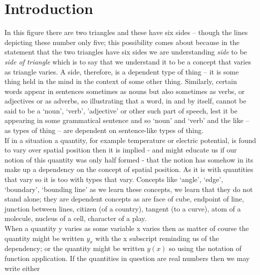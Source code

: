\documentclass[10pt,a4paper]{scrartcl}
\begin{document}
\section{Introduction}
\noindent In this figure
\raisebox{-0.5cm}{
\pspicture(0,-0.1)(1.1,1)
\psline(0,0)(0,1)(1,1)(1,0)(0,0)
\psline (0,0)(1,1)
\endpspicture
}
there are two triangles and these have six sides -- though the lines depicting these number only five; 
this possibility comes about
because in the statement that the two triangles have six sides we are understanding \textit{side}
to be \textit{side of triangle} which is to say that we understand it to be a concept that varies as
triangle varies. A side, therefore, is a dependent type of thing -- it is some thing held in the mind
in the context of some other thing. 
Similarly, certain words appear in sentences sometimes as
nouns but also sometimes as verbs, or adjectives or as adverbs, so illustrating that a word, in and by itself, cannot be said to 
be a `noun', `verb', 'adjective' or other such part of speech,  lest it be appearing in some grammatical sentence and so `noun' and `verb'
and the like -- as types of thing -- are dependent on sentence-like types of thing.  \\

\noindent If in a situation a quantity, for example temperature or electric potential, is found to vary over spatial position then it is implied - and might educate us if our notion of this quantity was only half formed - that the notion has somehow in its make up a dependency on the concept of spatial position. 
As it is with quantities that vary so it is too with types that vary. 
Concepts like `angle', `edge', `boundary', `bounding line' as we learn these concepts,
we learn that they do not stand alone; they are dependent concepts as are  face of cube,  endpoint of line,   junction between lines, citizen (of a country), tangent (to a curve), atom of a molecule,  nucleus of a cell, character of a play. \\

\noindent  When a quantity y varies as some variable x varies then as matter of course the quantity might be written $y_{x}$ with the x subscript  reminding us of the dependency; or the quantity might be written $y(x)$ so using the notation of function application.  
If the quantities in question are real numbers then we may write either
\end{document}
